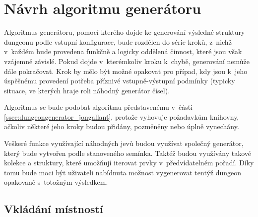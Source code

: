 
\section{Návrh algoritmu generátoru}
\label{sec:navrh_algoritmu}


Algoritmus generátoru, pomocí kterého dojde ke generování výsledné struktury dungeonu podle vstupní konfigurace, bude rozdělen do série kroků, z~nichž v~každém bude provedena funkčně a logicky oddělená činnost, které jsou však vzájemně závislé.
Pokud dojde v~kterémkoliv kroku k~chybě, generování nemůže dále pokračovat.
Krok by mělo být možné opakovat pro případ, kdy jsou k~jeho úspěšnému provedení potřeba příznivé vstupně-výstupní podmínky (typicky situace, ve kterých hraje roli náhodný generátor čísel).
\par
Algoritmus se bude podobat algoritmu představenému v~části \ref{ssec:dungeongenerator_jongallant}, protože vyhovuje požadavkům knihovny, ačkoliv některé jeho kroky budou přidány, pozměněny nebo úplně vynechány.
\par
Veškeré funkce využívající náhodných jevů budou využívat společný generátor, který bude vytvořen podle stanoveného semínka.
Taktéž budou využívány takové kolekce a struktury, které umožňují iterovat prvky v~předvídatelném pořadí.
Díky tomu bude moci být uživateli nabídnuta možnost vygenerovat tentýž dungeon opakovaně s~totožným výsledkem.


\subsection{Vkládání místností}


